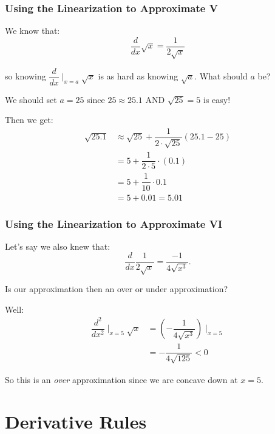\documentclass{ltx-talk}
\begin{document}
\begin{frame}
  \frametitle{Using the Linearization to Approximate V}

  We know that: \pause
  \begin{equation}
    \dfrac{d}{dx} \sqrt{x} = \dfrac{1}{2\sqrt{x}}
  \end{equation} \pause

  so knowing $\dfrac{d}{dx}\mid_{x = a} \sqrt{x}$ is as hard as knowing $\sqrt{a}$. What should $a$ be? \pause

  We should set $a = 25$ since $25 \approx 25.1$ AND $\sqrt{25} = 5$ is easy!

  Then we get:
  \begin{align}
    \sqrt{25.1} &\approx \sqrt{25} + \dfrac{1}{2 \cdot \sqrt{25}} (25.1 - 25) \\
                &= 5 + \dfrac{1}{2 \cdot 5} \cdot (0.1) \\
                &= 5 + \dfrac{1}{10} \cdot 0.1 \\
                &= 5 + 0.01 = 5.01
  \end{align}
\end{frame}

\begin{frame}
  \frametitle{Using the Linearization to Approximate VI}
  Let's say we also knew that:
  \begin{equation}
    \dfrac{d}{dx} \dfrac{1}{2 \sqrt{x}} = \dfrac{-1}{4 \sqrt{x^3}}. 
  \end{equation} \pause

  Is our approximation then an over or under approximation? \pause

  Well:
  \begin{align}
    \dfrac{d^2}{dx^2}\mid_{x = 5} \sqrt{x} &= \left(-\dfrac{1}{4\sqrt{x^3}}\right)\mid_{x = 5} \\
                                           &= -\dfrac{1}{4\sqrt{125}} < 0
  \end{align}

  So this is an \textit{over} approximation since we are concave down at $x = 5$.
\end{frame}

\section{Derivative Rules}
\end{document}
